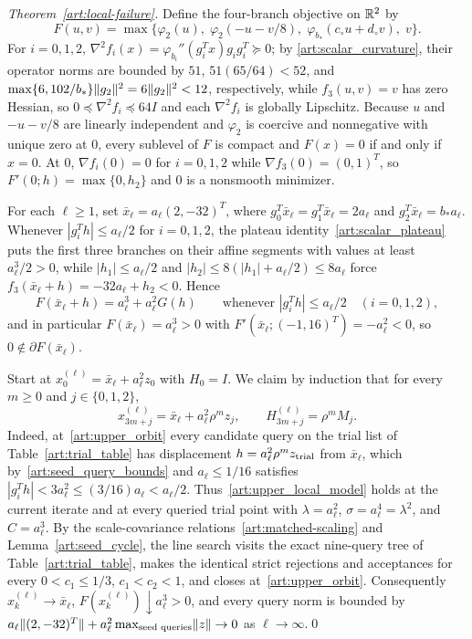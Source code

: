 \begin{proof}[Theorem~\ref{art:local-failure}]
Define the four-branch objective on $\mathbb R^2$ by
\begin{equation}\label{art:upper_objective}
 F(u,v)=\max\{\varphi_2(u),\;\varphi_2(-u-v/8),\;
                    \varphi_{b_*}(c_\circ u+d_\circ v),\;v\}.
\end{equation}
For $i=0,1,2$, $\nabla^2f_i(x)=\varphi_{b_i}''(g_i^Tx)g_ig_i^T\succeq0$; by
\eqref{art:scalar_curvature}, their operator norms are bounded by $51$,
$51(65/64)<52$, and $\max\{6,102/b_*\}\lVert g_2\rVert^2=6\lVert g_2\rVert^2<12$,
respectively, while $f_3(u,v)=v$
has zero Hessian, so $0\preceq\nabla^2f_i\preceq64I$ and each $\nabla^2f_i$ is
globally Lipschitz. Because $u$ and $-u-v/8$ are linearly independent and
$\varphi_2$ is coercive and nonnegative with unique zero at $0$, every sublevel
of $F$ is compact and $F(x)=0$ if and only if $x=0$. At $0$, $\nabla f_i(0)=0$
for $i=0,1,2$ while $\nabla f_3(0)=(0,1)^T$, so $F'(0;h)=\max\{0,h_2\}$ and $0$
is a nonsmooth minimizer.

For each $\ell\ge1$, set $\bar x_\ell=a_\ell(2,-32)^T$, where $g_0^T\bar x_\ell=g_1^T\bar x_\ell=2a_\ell$
and $g_2^T\bar x_\ell=b_*a_\ell$. Whenever $|g_i^Th|\le a_\ell/2$ for $i=0,1,2$,
the plateau identity~\eqref{art:scalar_plateau} puts the first three branches on
their affine segments with values at least $a_\ell^3/2>0$, while $|h_1|\le a_\ell/2$
and $|h_2|\le8(|h_1|+a_\ell/2)\le8a_\ell$ force $f_3(\bar x_\ell+h)=-32a_\ell+h_2<0$.
Hence
\begin{equation}\label{art:upper_local_model}
 F(\bar x_\ell+h)=a_\ell^3+a_\ell^2G(h)
 \qquad\text{whenever }|g_i^Th|\le a_\ell/2\quad(i=0,1,2),
\end{equation}
and in particular $F(\bar x_\ell)=a_\ell^3>0$ with $F'(\bar x_\ell;(-1,16)^T)=-a_\ell^2<0$,
so $0\notin\partial F(\bar x_\ell)$.

Start at $x_0^{(\ell)}=\bar x_\ell+a_\ell^2z_0$ with $H_0=I$. We claim by
induction that for every $m\ge0$ and $j\in\{0,1,2\}$,
\begin{equation}\label{art:upper_orbit}
 x_{3m+j}^{(\ell)}=\bar x_\ell+a_\ell^2\rho^mz_j,\qquad
 H_{3m+j}^{(\ell)}=\rho^mM_j.
\end{equation}
Indeed, at~\eqref{art:upper_orbit} every candidate query on the trial list of
Table~\ref{art:trial_table} has displacement $h=a_\ell^2\rho^mz_{\rm trial}$
from $\bar x_\ell$, which by~\eqref{art:seed_query_bounds} and $a_\ell\le1/16$
satisfies $|g_i^Th|<3a_\ell^2\le(3/16)a_\ell<a_\ell/2$. Thus~\eqref{art:upper_local_model}
holds at the current iterate and at every queried trial point with
$\lambda=a_\ell^2$, $\sigma=a_\ell^4=\lambda^2$, and $C=a_\ell^3$. By the
scale-covariance relations~\eqref{art:matched-scaling} and Lemma~\ref{art:seed_cycle},
the line search visits the exact nine-query tree of Table~\ref{art:trial_table},
makes the identical strict rejections and acceptances for every
$0<c_1\le1/3$, $c_1<c_2<1$, and closes at~\eqref{art:upper_orbit}. Consequently
$x_k^{(\ell)}\to\bar x_\ell$, $F(x_k^{(\ell)})\downarrow a_\ell^3>0$, and every
query norm is bounded by
$a_\ell\lVert(2,-32)^T\rVert+a_\ell^2\max_{\text{seed queries}}\lVert z\rVert\to0$ as
$\ell\to\infty$.\qed
\end{proof}

